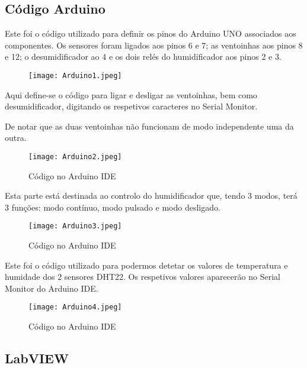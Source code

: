 \documentclass[journal]{IEEEtran}
\begin{document}



\subsection{Código Arduino}

Este foi o código utilizado para definir os pinos do Arduino UNO associados aos componentes. Os sensores foram ligados aos pinos 6 e 7; as ventoinhas aos pinos 8 e 12;
o desumidificador ao 4 e os dois relés do humidificador aos pinos 2 e 3.


 \begin{figure}[H]
    \centering
    \texttt{[image: Arduino1.jpeg]}
    \label{fig:1}
\end{figure}

Aqui define-se o código para ligar e desligar as ventoinhas, bem como desumidificador, digitando os respetivos caracteres no Serial Monitor.

De notar que as duas ventoinhas não funcionam de modo independente uma da outra. 


 \begin{figure}[H]
    \centering
    \texttt{[image: Arduino2.jpeg]}
    \caption{\label{fig:2} Código no Arduino IDE}
    \label{fig:2}
\end{figure}



Esta parte está destinada ao controlo do humidificador que, tendo 3 modos, terá 3 funções: modo contínuo, modo pulsado e modo desligado.

 \begin{figure}[H]
    \centering
    \texttt{[image: Arduino3.jpeg]}
    \caption{\label{fig:3} Código no Arduino IDE}
    \label{fig:3}
\end{figure}


Este foi o código utilizado para podermos detetar os valores de temperatura e humidade dos 2 sensores DHT22. Os respetivos valores aparecerão no Serial Monitor do Arduino IDE.

 \begin{figure}[H]
    \centering
    \texttt{[image: Arduino4.jpeg]}
    \caption{\label{fig:4} Código no Arduino IDE}
    \label{fig:4}
\end{figure}




\subsection{LabVIEW}
\end{document}
